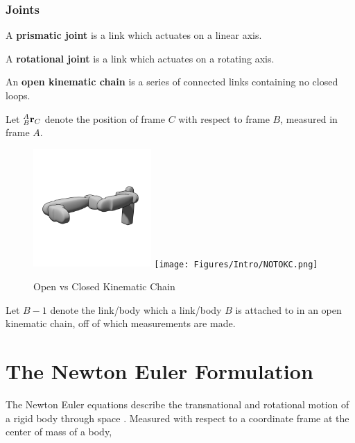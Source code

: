 \subsubsection{Joints}

\begin{definition}
A \textbf{prismatic joint} is a link which actuates on a linear axis.
\end{definition}

\begin{definition}
A \textbf{rotational joint} is a link which actuates on a rotating axis.
\end{definition}

\begin{definition}
An \textbf{open kinematic chain} is a series of connected links containing no closed loops.
\end{definition}


\begin{definition}Let $^A_B\mathbf{r}_C$ denote the position of frame $C$ with respect to frame $B$, measured in frame $A$.
\begin{figure}[H]
    \centering
    \includegraphics[width=0.4\textwidth]{Figures/Intro/OKC.png}
    \texttt{[image: Figures/Intro/NOTOKC.png]}
    \caption{Open vs Closed Kinematic Chain}
    \label{fig:okc}
\end{figure}
\end{definition}


\begin{definition}
Let $B-1$ denote the link/body which a link/body $B$ is attached to in an open kinematic chain, off of which measurements are made.
\end{definition}

\section{The Newton Euler Formulation}

The Newton Euler equations describe the transnational and rotational motion of a rigid body through space \cite{Hahn, asada_slotine_1986, shabana_2010}. Measured with respect to a coordinate frame at the center of mass of a body, 

